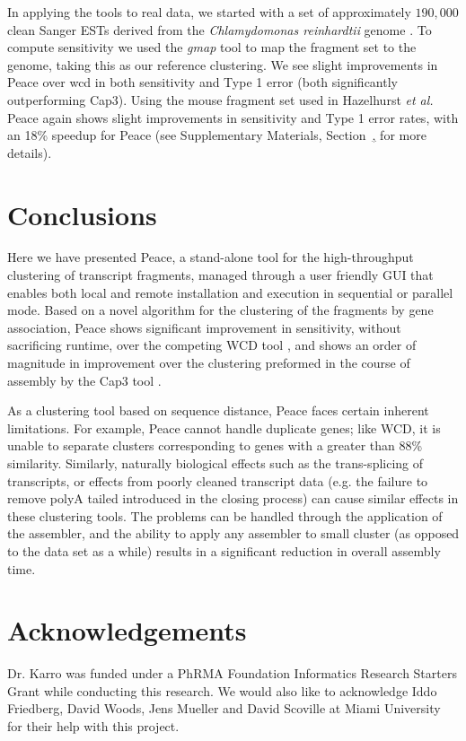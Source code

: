 \documentclass[a4,center,fleqn]{NAR}
\begin{document}
In applying the tools to real data, we started with a set of
approximately $190,000$ clean Sanger ESTs derived from the {\it
  Chlamydomonas reinhardtii} genome \cite{Liang2008}.  To compute
sensitivity we used the {\it gmap} tool \cite{Wu05} to map the
fragment set to the genome, taking this as our reference clustering.
We see slight improvements in {\sc Peace} over {\sc wcd} in both
sensitivity and Type 1 error (both significantly outperforming {\sc
  Cap3}).  Using the mouse fragment set used in Hazelhurst {\it et
  al.}  \cite{Hazelhurst08a} {\sc Peace} again shows slight
improvements in sensitivity and Type 1 error rates, with an 18\% speedup
for {\sc Peace} (see Supplementary Materials,
Section~\href{real_results}, for more details).

\section{Conclusions}

Here we have presented {\sc Peace}, a stand-alone tool for the
high-throughput clustering of transcript fragments, managed through a
user friendly GUI that enables both local and remote installation and
execution in sequential or parallel mode.  Based on a novel algorithm
for the clustering of the fragments by gene association, {\sc Peace}
shows significant improvement in sensitivity, without sacrificing  runtime,
over the competing {\sc WCD} tool \cite{Hazelhurst08a}, and shows an
order of magnitude in improvement over the clustering preformed in the
course of assembly by the {\sc Cap3} tool \cite{Huang99}.

As a clustering tool based on sequence distance, {\sc Peace} faces
certain inherent limitations. For example, {\sc Peace} cannot handle
duplicate genes; like {\sc WCD}, it is unable to separate clusters
corresponding to genes with a greater than 88\% similarity.
Similarly, naturally biological effects such as the trans-splicing of
transcripts, or effects from poorly cleaned transcript data (e.g. the
failure to remove polyA tailed introduced in the closing process) can
cause similar effects in these clustering tools.  The problems can be
handled through the application of the assembler, and the ability to
apply any assembler to small cluster (as opposed to the data set as a
while) results in a significant reduction in overall assembly time.

\section{Acknowledgements}

Dr. Karro was funded under a PhRMA Foundation Informatics Research
Starters Grant while conducting this research.  We would also like to
acknowledge Iddo Friedberg, David Woods, Jens Mueller and David
Scoville at Miami University for their help with this project.

\vspace{3mm}


\end{document}
